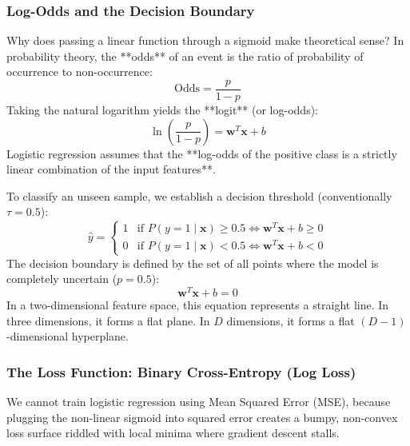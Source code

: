 \subsubsection{Log-Odds and the Decision Boundary}
Why does passing a linear function through a sigmoid make theoretical sense? In probability theory, the **odds** of an event is the ratio of probability of occurrence to non-occurrence:
\begin{equation}
\text{Odds} = \frac{p}{1 - p}
\end{equation}
Taking the natural logarithm yields the **logit** (or log-odds):
\begin{equation}
\ln\left( \frac{p}{1 - p} \right) = \mathbf{w}^T \mathbf{x} + b\label{eq:logit_form}
\end{equation}
Logistic regression assumes that the **log-odds of the positive class is a strictly linear combination of the input features**.

To classify an unseen sample, we establish a decision threshold (conventionally $\tau = 0.5$):
\begin{equation}
\hat{y} = \begin{cases} 1 & \text{if } P(y=1 \mid \mathbf{x}) \ge 0.5 \iff \mathbf{w}^T \mathbf{x} + b \ge 0 \\ 0 & \text{if } P(y=1 \mid \mathbf{x}) < 0.5 \iff \mathbf{w}^T \mathbf{x} + b < 0 \end{cases}
\end{equation}
The decision boundary is defined by the set of all points where the model is completely uncertain ($p = 0.5$):
\begin{equation}
\mathbf{w}^T \mathbf{x} + b = 0\label{eq:logistic_decision_boundary}
\end{equation}
In a two-dimensional feature space, this equation represents a straight line. In three dimensions, it forms a flat plane. In $D$ dimensions, it forms a flat $(D-1)$-dimensional hyperplane.

\subsubsection{The Loss Function: Binary Cross-Entropy (Log Loss)}
We cannot train logistic regression using Mean Squared Error (MSE), because plugging the non-linear sigmoid into squared error creates a bumpy, non-convex loss surface riddled with local minima where gradient descent stalls.

